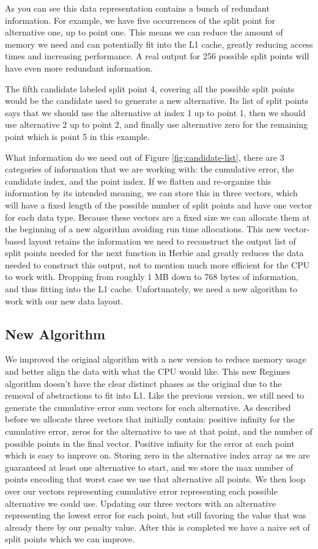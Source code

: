 \documentclass{article}
\begin{document}
As you can see this data representation contains a bunch of redundant information. For example, we have five occurrences of the split point for alternative one, up to point one. This means we can reduce the amount of memory we need and can potentially fit into the L1 cache, greatly reducing access times and increasing performance. A real output for 256 possible split points will have even more redundant information.

The fifth candidate labeled split point 4, covering all the possible split points would be the candidate used to generate a new alternative. Its list of split points says that we should use the alternative at index 1 up to point 1, then we should use alternative 2 up to point 2, and finally use alternative zero for the remaining point which is point 5 in this example. 

What information do we need out of Figure \ref{fig:candidate-list}, there are 3 categories of information that we are working with: the cumulative error, the candidate index, and the point index. If we flatten and re-organize this information by its intended meaning, we can store this in three vectors, which will have a fixed length of the possible number of split points and have one vector for each data type. Because these vectors are a fixed size we can allocate them at the beginning of a new algorithm avoiding run time allocations. This new vector-based layout retains the information we need to reconstruct the output list of split points needed for the next function in Herbie and greatly reduces the data needed to construct this output, not to mention much more efficient for the CPU to work with. Dropping from roughly 1 MB down to 768 bytes of information, and thus fitting into the L1 cache. 
Unfortunately, we need a new algorithm to work with our new data layout.

\subsection{New Algorithm}

We improved the original algorithm with a new version to reduce memory usage and better align the data with what the CPU would like. This new Regimes algorithm doesn’t have the clear distinct phases as the original due to the removal of abstractions to fit into L1. Like the previous version, we still need to generate the cumulative error sum vectors for each alternative. As described before we allocate three vectors that initially contain: positive infinity for the cumulative error, zeros for the alternative to use at that point, and the number of possible points in the final vector. Positive infinity for the error at each point which is easy to improve on. Storing zero in the alternative index array as we are guaranteed at least one alternative to start, and we store the max number of points encoding that worst case we use that alternative all points. We then loop over our vectors representing cumulative error representing each possible alternative we could use. Updating our three vectors with an alternative representing the lowest error for each point, but still favoring the value that was already there by our penalty value. After this is completed we have a naive set of split points which we can improve.
\end{document}
